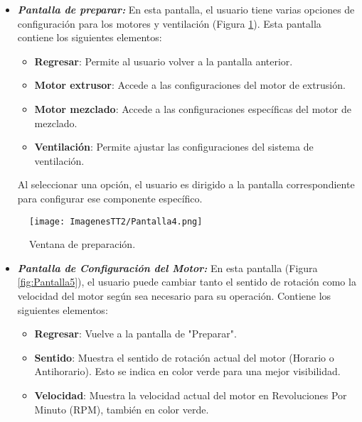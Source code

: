 \documentclass[14pt,oneside]{extarticle} %
\begin{document}
\begin{itemize}
    \item \textit{\textbf{Pantalla de preparar:}} En esta pantalla, el usuario tiene varias opciones de configuración para los motores y ventilación (Figura \ref{fig:Pantalla4}). Esta pantalla contiene los siguientes elementos:

    \begin{itemize}
        \item \textbf{Regresar}: Permite al usuario volver a la pantalla anterior.
        \item \textbf{Motor extrusor}: Accede a las configuraciones del motor de extrusión.
        \item \textbf{Motor mezclado}: Accede a las configuraciones específicas del motor de mezclado.
        \item \textbf{Ventilación}: Permite ajustar las configuraciones del sistema de ventilación.
\end{itemize}

    Al seleccionar una opción, el usuario es dirigido a la pantalla correspondiente para configurar ese componente específico.
    
\end{itemize}

\begin{figure}[h!]
    \centering
    \texttt{[image: ImagenesTT2/Pantalla4.png]}
    \caption{Ventana de preparación.}
    \label{fig:Pantalla4}
\end{figure}

\newpage

\begin{itemize}
    \item \textit{\textbf{Pantalla de Configuración del Motor:}} En esta pantalla (Figura \ref{fig:Pantalla5}), el usuario puede cambiar tanto el sentido de rotación como la velocidad del motor según sea necesario para su operación. Contiene los siguientes elementos:

    \begin{itemize}
        \item \textbf{Regresar}: Vuelve a la pantalla de "Preparar".
        \item \textbf{Sentido}: Muestra el sentido de rotación actual del motor (Horario o Antihorario). Esto se indica en color verde para una mejor visibilidad.
        \item \textbf{Velocidad}: Muestra la velocidad actual del motor en Revoluciones Por Minuto (RPM), también en color verde.
    \end{itemize}
    
\end{itemize}
\end{document}
